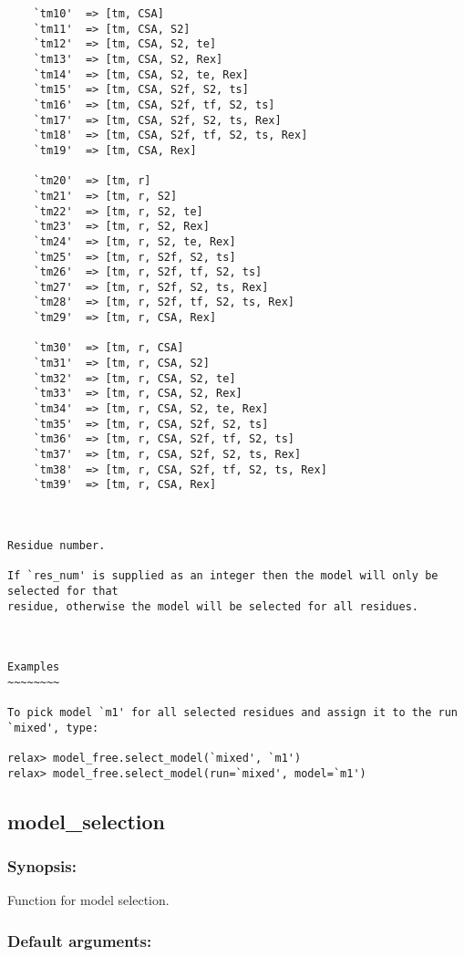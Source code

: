 {\begin{verbatim}
    `tm10'  => [tm, CSA]
    `tm11'  => [tm, CSA, S2]
    `tm12'  => [tm, CSA, S2, te]
    `tm13'  => [tm, CSA, S2, Rex]
    `tm14'  => [tm, CSA, S2, te, Rex]
    `tm15'  => [tm, CSA, S2f, S2, ts]
    `tm16'  => [tm, CSA, S2f, tf, S2, ts]
    `tm17'  => [tm, CSA, S2f, S2, ts, Rex]
    `tm18'  => [tm, CSA, S2f, tf, S2, ts, Rex]
    `tm19'  => [tm, CSA, Rex]

    `tm20'  => [tm, r]
    `tm21'  => [tm, r, S2]
    `tm22'  => [tm, r, S2, te]
    `tm23'  => [tm, r, S2, Rex]
    `tm24'  => [tm, r, S2, te, Rex]
    `tm25'  => [tm, r, S2f, S2, ts]
    `tm26'  => [tm, r, S2f, tf, S2, ts]
    `tm27'  => [tm, r, S2f, S2, ts, Rex]
    `tm28'  => [tm, r, S2f, tf, S2, ts, Rex]
    `tm29'  => [tm, r, CSA, Rex]

    `tm30'  => [tm, r, CSA]
    `tm31'  => [tm, r, CSA, S2]
    `tm32'  => [tm, r, CSA, S2, te]
    `tm33'  => [tm, r, CSA, S2, Rex]
    `tm34'  => [tm, r, CSA, S2, te, Rex]
    `tm35'  => [tm, r, CSA, S2f, S2, ts]
    `tm36'  => [tm, r, CSA, S2f, tf, S2, ts]
    `tm37'  => [tm, r, CSA, S2f, S2, ts, Rex]
    `tm38'  => [tm, r, CSA, S2f, tf, S2, ts, Rex]
    `tm39'  => [tm, r, CSA, Rex]



Residue number.

If `res_num' is supplied as an integer then the model will only be selected for that
residue, otherwise the model will be selected for all residues.



Examples
~~~~~~~~

To pick model `m1' for all selected residues and assign it to the run `mixed', type:

relax> model_free.select_model(`mixed', `m1')
relax> model_free.select_model(run=`mixed', model=`m1')
\end{verbatim}
}



\newpage

\subsection{model\_selection}


\subsubsection{Synopsis:}

Function for model selection.

\subsubsection{Default arguments:}

